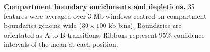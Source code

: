 \documentclass[a4paper,11pt,oneside]{book}
\begin{document}
\restoregeometry


\setcounter{figure}{0}
\makeatletter 
\renewcommand{\thefigure}{S\@arabic\c@figure}
\makeatother

\begin{figure}
\begin{center}
\captionsetup{width=\textwidth}
\caption[Compartment boundary enrichments and depletions.]{ {\bf Compartment boundary enrichments and depletions.}
35 features were averaged over 3 Mb windows centred on compartment boundaries genome-wide ($30 \times 100$ kb bins). Boundaries are orientated as A to B transitions. Ribbons represent $95\%$ confidence intervals of the mean at each position.
}\label{fig:allcompsorientated}
\end{center}
\end{figure} 

\clearpage




\ifstandalone
\begin{small}

\end{small}
\fi
\end{document}

